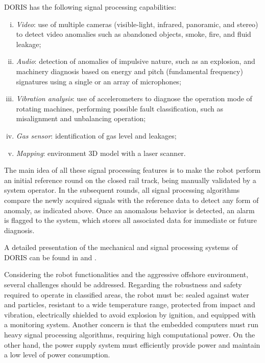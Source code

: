 \documentclass{ifacconf}
\begin{document}
DORIS has the following signal processing capabilities:
\begin{enumerate}[i)]
\item \emph{Video}: use of multiple cameras (visible-light, infrared, panoramic,
and stereo) to detect video anomalies such as abandoned objects, smoke, fire, and fluid leakage;
\item \emph{Audio}: detection of anomalies of impulsive nature, such as an
explosion, and machinery diagnosis based on energy and pitch (fundamental
frequency) signatures using a single or an array of microphones;
\item \emph{Vibration analysis}: use of accelerometers to
diagnose the operation mode of rotating machines, performing possible fault
classification, such as misalignment and unbalancing operation;
\item \emph{Gas sensor}: identification of gas level and leakages;
\item \emph{Mapping}: environment 3D model with a laser scanner.
\end{enumerate}

The main idea of all these signal processing features is to make the robot
perform an initial reference round on the closed rail track, being manually
validated by a system operator. In the subsequent rounds, all signal processing
algorithms compare the newly acquired signals with the reference data to detect
any form of anomaly, as indicated above. Once an anomalous behavior is
detected, an alarm is flagged to the system, which stores all associated data
for immediate or future diagnosis.

A detailed presentation of the mechanical and signal
processing systems of DORIS can be found in \cite{OTC} and \cite{cba}.

Considering the robot functionalities and the aggressive offshore environment,
several challenges should be addressed. Regarding the robustness and safety
required to operate in classified areas, the robot must be: sealed against water
and particles, resistant to a wide temperature range, protected from impact and
vibration, electrically shielded to avoid explosion by ignition, and equipped
with a monitoring system. Another concern is that the embedded computers must
run heavy signal processing algorithms, requiring high computational power. On
the other hand, the power supply system must efficiently provide power and
maintain a low level of power consumption.
\end{document}
